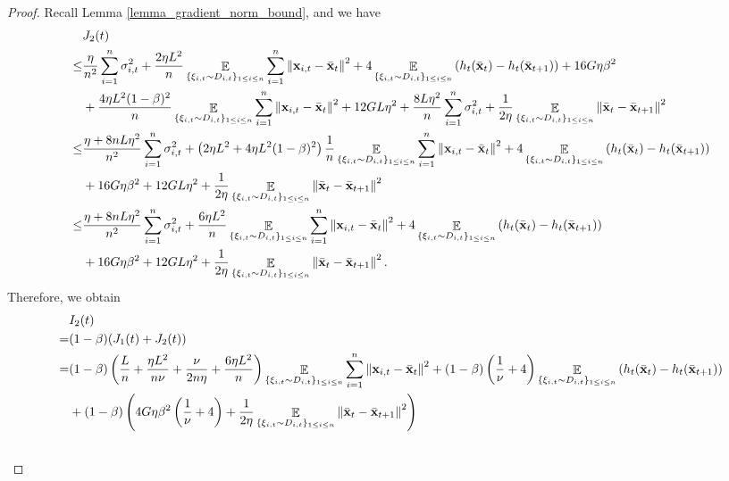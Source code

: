 \documentclass{article}
\begin{document}
\begin{proof}
Recall Lemma \ref{lemma_gradient_norm_bound}, and we have
\begin{align}
\nonumber
& J_2(t) \\ \nonumber 
\le & \frac{\eta}{n^2} \sum_{i=1}^n\sigma_{i,t}^2 + \frac{2\eta L^2}{n}\mathop{\mathbb{E}}_{ \{\xi_{i,t} \sim D_{i,t}\}_{1\le i \le n} }\sum_{i=1}^n \left\lVert{\bf x}_{i,t} - \bar{{\bf x}}_t \right\rVert^2 + 4\mathop{\mathbb{E}}_{ \{\xi_{i,t} \sim D_{i,t}\}_{1\le i \le n} } \left( h_t(\bar{{\bf x}}_t) - h_t(\bar{{\bf x}}_{t+1}) \right) + 16 G\eta \beta^2   \\ \nonumber
& + \frac{4\eta L^2 (1-\beta)^2}{n}\mathop{\mathbb{E}}_{ \{\xi_{i,t} \sim D_{i,t}\}_{1\le i \le n} }\sum_{i=1}^n \left\lVert{\bf x}_{i,t} - \bar{{\bf x}}_t\right\rVert^2 + 12GL\eta^2 + \frac{8L\eta^2}{n} \sum_{i=1}^n \sigma_{i,t}^2  + \frac{1}{2\eta} \mathop{\mathbb{E}}_{ \{\xi_{i,t} \sim D_{i,t}\}_{1\le i \le n} } \left\lVert \bar{{\bf x}}_t - \bar{{\bf x}}_{t+1}\right\rVert^2 \\ \nonumber
\le & \frac{\eta + 8nL\eta^2}{n^2} \sum_{i=1}^n\sigma_{i,t}^2 + \left(  2\eta L^2 + 4\eta L^2(1-\beta)^2  \right)\frac{1}{n}\mathop{\mathbb{E}}_{ \{\xi_{i,t} \sim D_{i,t}\}_{1\le i \le n} }\sum_{i=1}^n \left\lVert{\bf x}_{i,t} - \bar{{\bf x}}_t\right\rVert^2 + 4\mathop{\mathbb{E}}_{ \{\xi_{i,t} \sim D_{i,t}\}_{1\le i \le n} } \left( h_t(\bar{{\bf x}}_t) - h_t(\bar{{\bf x}}_{t+1}) \right) \\ \nonumber 
& + 16G\eta \beta^2 + 12GL\eta^2 + \frac{1}{2\eta} \mathop{\mathbb{E}}_{ \{\xi_{i,t} \sim D_{i,t}\}_{1\le i \le n} }\left\lVert \bar{{\bf x}}_t - \bar{{\bf x}}_{t+1}\right\rVert^2 \\ \nonumber
\le & \frac{\eta + 8nL\eta^2}{n^2} \sum_{i=1}^n\sigma_{i,t}^2 + \frac{6\eta L^2}{n}\mathop{\mathbb{E}}_{ \{\xi_{i,t} \sim D_{i,t}\}_{1\le i \le n} }\sum_{i=1}^n \left\lVert{\bf x}_{i,t} - \bar{{\bf x}}_t\right\rVert^2 + 4\mathop{\mathbb{E}}_{ \{\xi_{i,t} \sim D_{i,t}\}_{1\le i \le n} } \left( h_t(\bar{{\bf x}}_t) - h_t(\bar{{\bf x}}_{t+1}) \right) \\ \nonumber 
& + 16G\eta \beta^2 + 12GL\eta^2 + \frac{1}{2\eta} \mathop{\mathbb{E}}_{ \{\xi_{i,t} \sim D_{i,t}\}_{1\le i \le n} }\left\lVert \bar{{\bf x}}_t - \bar{{\bf x}}_{t+1}\right\rVert^2.
\end{align} Therefore, we obtain
\begin{align}
\nonumber
& I_2(t) \\ \nonumber 
= & (1-\beta)(J_1(t) + J_2(t)) \\ \nonumber
= &  (1-\beta)\lrincir{ \frac{L}{n} + \frac{\eta L^2}{n\nu} + \frac{\nu}{2n\eta} + \frac{6\eta L^2}{n} }\EE_{ \{\xi_{i,t} \sim D_{i,t}\}_{1\le i \le n} }\sum_{i=1}^n\lrnorm{\x_{i,t} - \bar{\x}_t }^2  + (1-\beta)\lrincir{\frac{1}{\nu} + 4} \EE_{ \{\xi_{i,t} \sim D_{i,t}\}_{1\le i \le n} } \lrincir{h_t(\bar{\x}_t) - h_t(\bar{\x}_{t+1})}\\ \nonumber 
&+ (1-\beta) \lrincir{ 4G\eta\beta^2\lrincir{\frac{1}{\nu} + 4} +  \frac{1}{2\eta} \EE_{ \{\xi_{i,t} \sim D_{i,t}\}_{1\le i \le n} }\lrnorm{ \bar{\x}_t - \bar{\x}_{t+1}}^2 } \\ \nonumber 

\end{align}
\end{proof}
\end{document}
